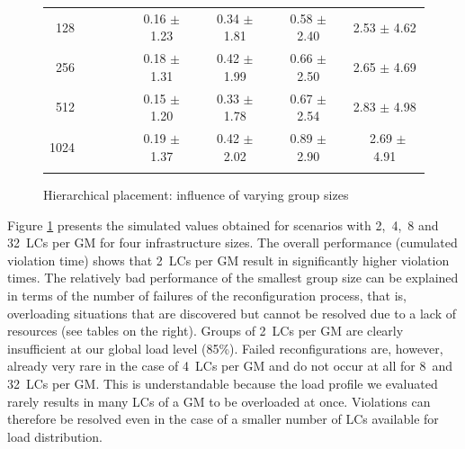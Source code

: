 \begin{figure}
\begin{minipage}{.60\textwidth}
{{\begin{tabular}[b]{|r@{\:}||@{\:}c@{\:}|@{\:}c@{\:}|@{\:}c@{\:}|@{\:}c@{\:}|}
        128~~~~~~~ &   0.16 $\pm$   1.23 &   0.34 $\pm$   1.81 &   0.58 $\pm$   2.40 &   2.53 $\pm$   4.62  \\
        256~~~~~~~ &   0.18 $\pm$   1.31 &   0.42 $\pm$   1.99 &   0.66 $\pm$   2.50 &   2.65 $\pm$   4.69  \\
        512~~~~~~~ &   0.15 $\pm$   1.20 &   0.33 $\pm$   1.78 &   0.67 $\pm$   2.54 &   2.83 $\pm$   4.98  \\
       1024~~~~~~~ &   0.19 $\pm$   1.37 &   0.42 $\pm$   2.02 &   0.89 $\pm$   2.90 &   ~2.69 $\pm$   4.91

      \Rstrut  \\ \hline
      \thickhline
  \end{tabular} }
  \label{fig:groupSizesComputationTime}
  }
\end{minipage}
\vspace*{-.6cm}
\caption{Hierarchical placement: influence of varying group sizes}
\label{fig:snoozeGroupSizes}
\vspace*{-.6cm}
\end{figure}
%
%
Figure \ref{fig:snoozeGroupSizes} presents the simulated values
obtained for scenarios with 2,~4,~8 and 32~LCs per GM for four
infrastructure sizes. The overall performance (\ie cumulated violation
time) shows that
2~LCs per GM result in significantly higher violation times.
The relatively bad performance of the smallest group size can be
explained in terms of the number of failures of the reconfiguration
process, that is, overloading situations that are discovered but
cannot be resolved 
due to a lack of resources (see tables on the right).  Groups of 2~LCs
per GM are clearly insufficient at our global load level (85\%).
Failed reconfigurations are, however, already very rare in the case of
4~LCs per GM and do not occur at all for 8~and 32~LCs per GM. This is
understandable because 
the load profile we evaluated rarely results in many LCs of a GM to be
overloaded at once. Violations can therefore be resolved even in the
case of a smaller number of LCs available for load distribution.
